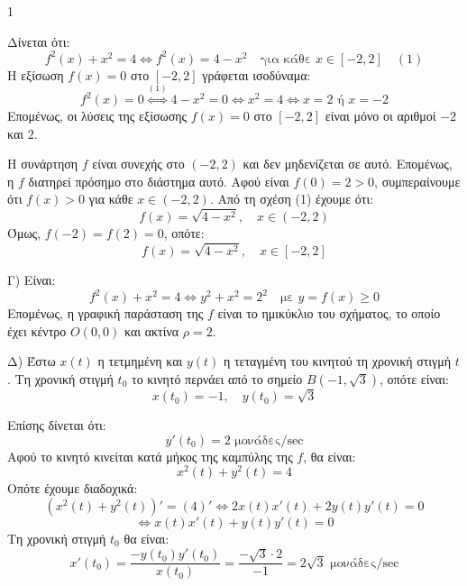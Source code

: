 \begin{ylh}{1}
    \item [Ύλη από εικόνα]
\end{ylh}

\begin{figure}
\centering
{}
\end{figure}

\begin{alist}
\item Δίνεται ότι:
\[ f^2(x) + x^2 = 4 \iff f^2(x) = 4 - x^2 \quad \text{για κάθε } x \in [-2,2] \quad (1) \]
Η εξίσωση $f(x)=0$ στο $[-2,2]$ γράφεται ισοδύναμα:
\[ f^2(x) = 0 \overset{(1)}{\iff} 4 - x^2 = 0 \iff x^2 = 4 \iff x = 2 \text{ ή } x = -2 \]
Επομένως, οι λύσεις της εξίσωσης $f(x)=0$ στο $[-2,2]$ είναι μόνο οι αριθμοί $-2$ και $2$.

\item Η συνάρτηση $f$ είναι συνεχής στο $(-2,2)$ και δεν μηδενίζεται σε αυτό. Επομένως, η $f$ διατηρεί πρόσημο στο διάστημα αυτό.
Αφού είναι $f(0) = 2 > 0$, συμπεραίνουμε ότι $f(x) > 0$ για κάθε $x \in (-2,2)$.
Από τη σχέση (1) έχουμε ότι:
\[ f(x) = \sqrt{4 - x^2}, \quad x \in (-2,2) \]
Όμως, $f(-2) = f(2) = 0$, οπότε:
\[ f(x) = \sqrt{4 - x^2}, \quad x \in [-2,2] \]

\item Γ) Είναι:
\[ f^2(x) + x^2 = 4 \iff y^2 + x^2 = 2^2 \quad \text{με } y = f(x) \ge 0 \]
Επομένως, η γραφική παράσταση της $f$ είναι το ημικύκλιο του σχήματος, το οποίο έχει κέντρο $O(0,0)$ και ακτίνα $\rho = 2$.

\item Δ) Έστω $x(t)$ η τετμημένη και $y(t)$ η τεταγμένη του κινητού τη χρονική στιγμή $t$. Τη χρονική στιγμή $t_0$ το κινητό περνάει από το σημείο $B(-1, \sqrt{3})$, οπότε είναι:
\[ x(t_0) = -1, \quad y(t_0) = \sqrt{3} \]

Επίσης δίνεται ότι:
\[ y'(t_0) = 2 \text{ μονάδες/sec} \]
Αφού το κινητό κινείται κατά μήκος της καμπύλης της $f$, θα είναι:
\[ x^2(t) + y^2(t) = 4 \]
Οπότε έχουμε διαδοχικά:
\[ \left(x^2(t) + y^2(t)\right)' = (4)' \iff 2x(t)x'(t) + 2y(t)y'(t) = 0 \]
\[ \iff x(t)x'(t) + y(t)y'(t) = 0 \]
Τη χρονική στιγμή $t_0$ θα είναι:
\[ x'(t_0) = \frac{-y(t_0)y'(t_0)}{x(t_0)} = \frac{-\sqrt{3} \cdot 2}{-1} = 2\sqrt{3} \text{ μονάδες/sec} \]
\end{alist}